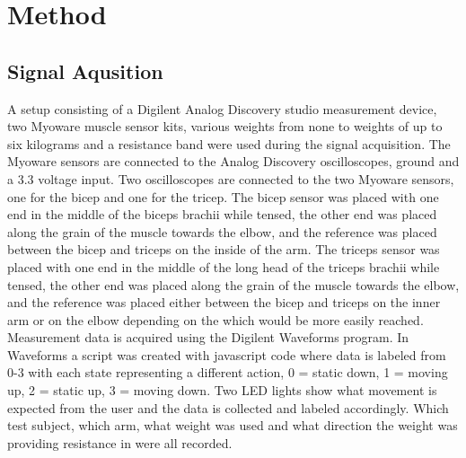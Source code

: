 \section{Method}
\label{section:method}



\subsection{Signal Aqusition}
A setup consisting of a Digilent Analog Discovery studio measurement device, two Myoware muscle sensor 
kits, various weights from none to weights of up to six kilograms and a resistance 
band were used during the signal acquisition. The Myoware sensors are connected to the Analog Discovery 
oscilloscopes, ground and a 3.3 voltage input. Two oscilloscopes are connected to the two Myoware 
sensors, one for the bicep and one for the tricep. The bicep sensor was placed with one end in the 
middle of the biceps brachii while tensed, the other end was placed along the grain of the muscle 
towards the elbow, and the reference was placed between the bicep and triceps on the inside of the arm. 
The triceps sensor was placed with one end in the middle of the long head of the triceps brachii while 
tensed, the other end was placed along the grain of the muscle towards the elbow, and the reference was 
placed either between the bicep and triceps on the inner arm or on the elbow depending on the which would 
be more easily reached. Measurement data is acquired using the Digilent Waveforms program. In Waveforms a 
script was created with javascript code where data is labeled from 0-3 with each state representing a 
different action, 0 = static down, 1 = moving up, 2 = static up, 3 = moving down. Two LED lights show what 
movement is expected from the user and the data is collected and labeled accordingly. Which test subject, 
which arm, what weight was used and what direction the weight was providing resistance in were all recorded.


